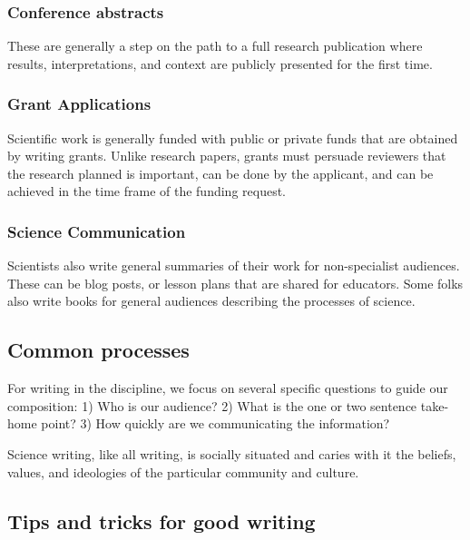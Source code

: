 \documentclass[11pt,]{article}
\begin{document}
\subsubsection{Conference abstracts}\label{conference-abstracts}

These are generally a step on the path to a full research publication
where results, interpretations, and context are publicly presented for
the first time.

\subsubsection{Grant Applications}\label{grant-applications}

Scientific work is generally funded with public or private funds that
are obtained by writing grants. Unlike research papers, grants must
persuade reviewers that the research planned is important, can be done
by the applicant, and can be achieved in the time frame of the funding
request.

\subsubsection{Science Communication}\label{science-communication}

Scientists also write general summaries of their work for non-specialist
audiences. These can be blog posts, or lesson plans that are shared for
educators. Some folks also write books for general audiences describing
the processes of science.

\subsection{Common processes}\label{common-processes}

For writing in the discipline, we focus on several specific questions to
guide our composition: 1) Who is our audience? 2) What is the one or two
sentence take-home point? 3) How quickly are we communicating the
information?

Science writing, like all writing, is socially situated and caries with
it the beliefs, values, and ideologies of the particular community and
culture.

\subsection{Tips and tricks for good
writing}\label{tips-and-tricks-for-good-writing}
\end{document}
